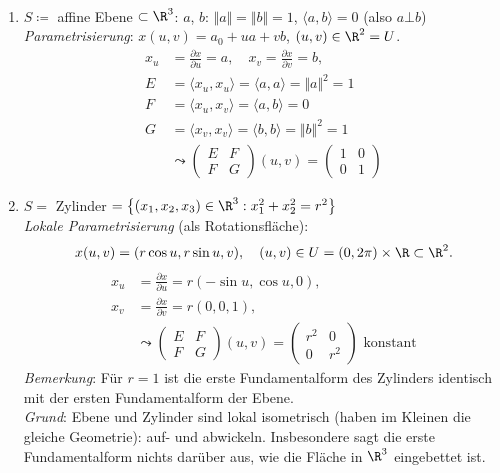 \begin{example}
  \
  \begin{enumerate}

    \item \( S \coloneqq \) affine Ebene \( \subset \R^3 \): \( a \), \( b \): \( \Vert a \Vert = \Vert b \Vert = 1 \), \( \langle a, b \rangle = 0 \) (also \( a \bot b \)) \\
    \emph{Parametrisierung}: \( x(u,v) = a_0 + ua + vb \), \( (u,v) \in \R^2 = U \).
    \begin{align*}
      x_u &= \frac{\partial x}{\partial u} = a, \quad x_v = \frac{\partial x}{\partial v} = b\text{,} \\
      E &= \langle x_u, x_u \rangle = \langle a, a \rangle = \Vert a \Vert^2 = 1 \\
      F &= \langle x_u, x_v \rangle = \langle a, b \rangle = 0 \\
      G &= \langle x_v, x_v \rangle = \langle b, b \rangle = \Vert b \Vert^2 = 1 \\
      &\leadsto \begin{pmatrix}
        E & F \\
        F & G
      \end{pmatrix}(u,v) = \begin{pmatrix}
        1 & 0 \\
        0 & 1
      \end{pmatrix}
    \end{align*}

    \item \( S = \) Zylinder \( = \left \{ (x_1, x_2, x_3) \in \R^3 : x_1^2+x_2^2 = r^2 \right \} \) \\
    \emph{Lokale Parametrisierung} (als Rotationsfläche):
    \begin{equation*}
      x(u,v) = (r \cos u, r \sin u, v), \quad (u,v) \in U = (0,2\pi) \times \R \subset \R^2\text{.}
    \end{equation*}
    \begin{align*}
      x_u &= \frac{\partial x}{\partial u} = r(-\sin u, \cos u, 0)\text{,} \\
      x_v &= \frac{\partial x}{\partial v} = r(0,0,1)\text{,} \\
        &\leadsto \begin{pmatrix}
          E & F \\
          F & G
        \end{pmatrix}(u,v) = \begin{pmatrix}
          r^2 & 0 \\
          0 & r^2
        \end{pmatrix} \text{ konstant}
    \end{align*}
    \emph{Bemerkung}: Für \( r = 1 \) ist die erste Fundamentalform des Zylinders identisch mit der ersten Fundamentalform der Ebene. \\
    \emph{Grund}: Ebene und Zylinder sind lokal isometrisch (haben im Kleinen die gleiche Geometrie): auf- und abwickeln. Insbesondere sagt die erste Fundamentalform nichts darüber aus, wie die Fläche in \( \R^3 \) eingebettet ist.


\end{enumerate}
\end{example}
